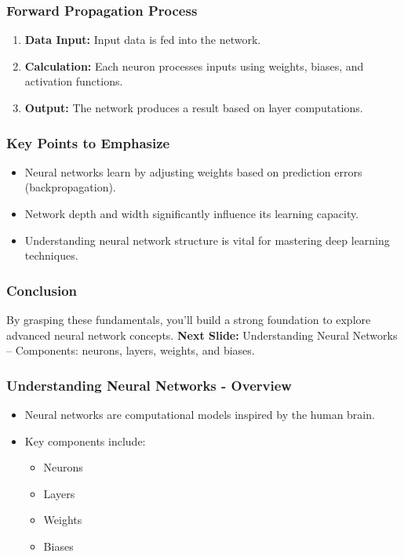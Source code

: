 \documentclass{beamer}
\begin{document}
\begin{frame}[fragile]
    \frametitle{Forward Propagation Process}
    \begin{enumerate}
        \item \textbf{Data Input:} Input data is fed into the network.
        \item \textbf{Calculation:} Each neuron processes inputs using weights, biases, and activation functions.
        \item \textbf{Output:} The network produces a result based on layer computations.
    \end{enumerate}
\end{frame}

\begin{frame}[fragile]
    \frametitle{Key Points to Emphasize}
    \begin{itemize}
        \item Neural networks learn by adjusting weights based on prediction errors (backpropagation).
        \item Network depth and width significantly influence its learning capacity.
        \item Understanding neural network structure is vital for mastering deep learning techniques.
    \end{itemize}
\end{frame}

\begin{frame}[fragile]
    \frametitle{Conclusion}
    By grasping these fundamentals, you'll build a strong foundation to explore advanced neural network concepts.
    \vspace{1em}
    \textbf{Next Slide:} Understanding Neural Networks – Components: neurons, layers, weights, and biases.
\end{frame}

\begin{frame}[fragile]
    \frametitle{Understanding Neural Networks - Overview}
    \begin{itemize}
        \item Neural networks are computational models inspired by the human brain.
        \item Key components include:
        \begin{itemize}
            \item Neurons
            \item Layers
            \item Weights
            \item Biases
        \end{itemize}
    \end{itemize}
\end{frame}
\end{document}
